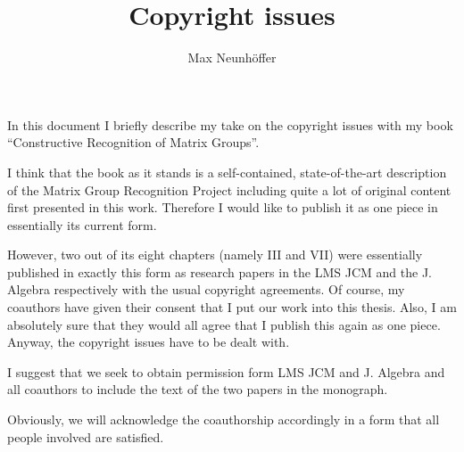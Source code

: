 \documentclass[11pt]{article}
\begin{document}
\title{Copyright issues}
\author{Max Neunh\"offer}
\maketitle

In this document I briefly describe my take on the copyright issues
with my book ``Constructive Recognition of Matrix Groups''.

I think that the book as it stands is a self-contained, state-of-the-art
description of the Matrix Group Recognition Project including quite a
lot of original content first presented in this work. Therefore I would
like to publish it as one piece in essentially its current form.

However, two out of its eight chapters (namely III and VII) were
essentially published in exactly this form as research papers in
the LMS JCM and the J. Algebra respectively with the usual copyright
agreements. Of course, my coauthors have given their consent that I
put our work into this thesis. Also, I am absolutely sure that they
would all agree that I publish this again as one piece. Anyway, the
copyright issues have to be dealt with.

I suggest that we seek to obtain permission form LMS JCM and J. Algebra 
and all coauthors to include the text of the two papers in the monograph.

Obviously, we will acknowledge the coauthorship accordingly in a form
that all people involved are satisfied.
\end{document}
